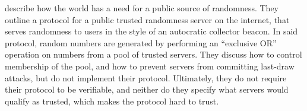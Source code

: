 \citet{fischer2011publicrandomnessservice} describe how the world has a need for a public source of randomness.
They outline a protocol for a public trusted randomness server on the internet, that serves randomness to users in the style of an autocratic collector beacon.
In said protocol, random numbers are generated by performing an \enquote{exclusive OR} operation on numbers from a pool of trusted servers.
They discuss how to control membership of the pool, and how to prevent servers from committing last-draw attacks, but do not implement their protocol.
Ultimately, they do not require their protocol to be verifiable, and neither do they specify what servers would qualify as trusted, which makes the protocol hard to trust.
